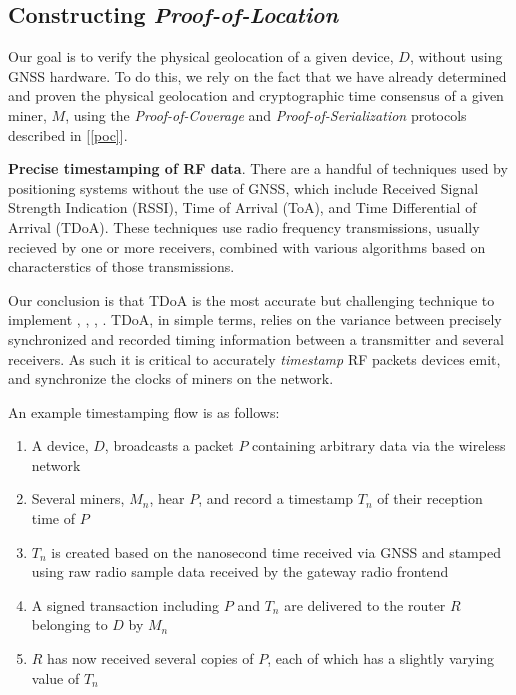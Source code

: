 \documentclass[10pt, nonatbib, nocopyrightspace, reprint]{sigplanconf}
\newcommand{\secref}[1]{[\autoref{#1}]}
\begin{document}
\subsection{Constructing \emph{Proof-of-Location}}

Our goal is to verify the physical geolocation of a given device, $D$, without using GNSS hardware. To do this, we rely on the fact that we have already determined and proven the physical geolocation and cryptographic time consensus of a given miner, $M$, using the \emph{Proof-of-Coverage} and \emph{Proof-of-Serialization} protocols described in \secref{poc}. 

\textbf{Precise timestamping of RF data}. There are a handful of techniques used by positioning systems without the use of GNSS, which include Received Signal Strength Indication (RSSI), Time of Arrival (ToA), and Time Differential of Arrival (TDoA). These techniques use radio frequency transmissions, usually recieved by one or more receivers, combined with various algorithms based on characterstics of those transmissions.

Our conclusion is that TDoA is the most accurate but challenging technique to implement \cite{tdoavsrssi}, \cite{tdoavstoa}, \cite{wifipositioning}, \cite{locationestimation}. TDoA, in simple terms, relies on the variance between precisely synchronized and recorded timing information between a transmitter and several receivers. As such it is critical to accurately \emph{timestamp} RF packets devices emit, and synchronize the clocks of miners on the network.

An example timestamping flow is as follows:

\begin{enumerate}
  \item A device, $D$, broadcasts a packet $P$ containing arbitrary data via the wireless network
  \item Several miners, $M_n$, hear $P$, and record a timestamp $T_n$ of their reception time of $P$
  \item $T_n$ is created based on the nanosecond time received via GNSS and stamped using raw radio sample data received by the gateway radio frontend
  \item A signed transaction including $P$ and $T_n$ are delivered to the router $R$ belonging to $D$ by $M_n$
  \item $R$ has now received several copies of $P$, each of which has a slightly varying value of $T_n$
\end{enumerate}
\end{document}
